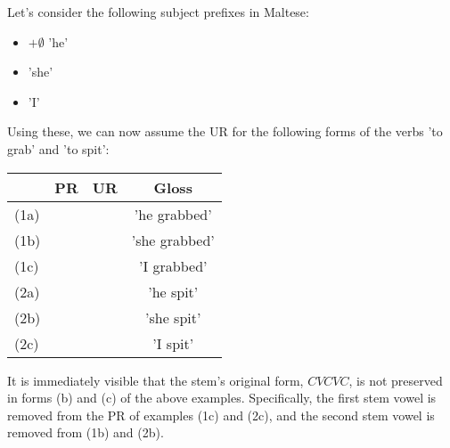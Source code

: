 \documentclass[11pt,draft]{article}
\begin{document}
Let's consider the following subject prefixes in Maltese\cite{brame1974}:

\begin{itemize}
	\item $+\emptyset$ 'he'
	\item {} 'she'
	\item {} 'I'
\end{itemize}

Using these, we can now assume the UR for the following forms of the verbs  'to grab' and  'to spit':

\begin{table}[htdp]
\begin{tabularx}{400pt}{|l| C | C | C|}
	\hline
	&
	PR &
	UR &
	Gloss \\\hline\hline
	
	(1a) &
	 &
	 &
	'he grabbed' \\
	
	(1b) &
	 &
	 &
	'she grabbed' \\
	
	(1c) &
	 &
	 &
	'I grabbed' \\\hline
	
	(2a) &
	 &
	 &
	'he spit' \\
	
	(2b) &
	 &
	 &
	'she spit' \\
	
	(2c) &
	 &
	 &
	'I spit' \\\hline
	
\end{tabularx}
\end{table}

It is immediately visible that the stem's original form, $CVCVC$, is not preserved in forms (b) and (c) of the above examples.
Specifically, the first stem vowel is removed from the PR of examples (1c) and (2c), and the second stem vowel is removed from (1b) and (2b).

%
%
%	
%




\end{document}
